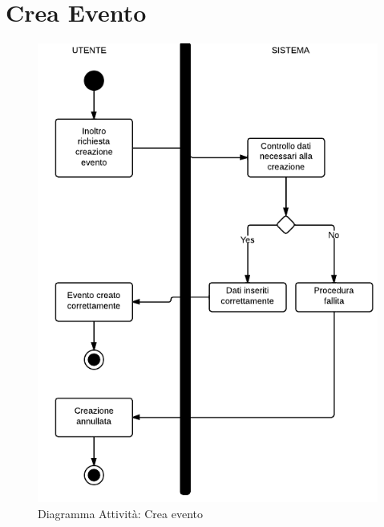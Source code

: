 \section{Crea Evento}
\begin{figure}[H]
\centering
\includegraphics[scale=0.55]{img/activity/crea.png}
\caption{Diagramma Attività: Crea evento}
\label{fig:creaev}
\end{figure}

